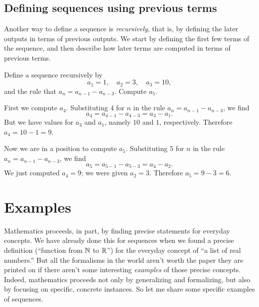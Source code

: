 \subsection{Defining sequences using previous terms}


Another way to define a sequence is \textit{recursively}, that is, by
defining the later outputs in terms of previous outputs.  We start by
defining the first few terms of the sequence, and then describe how
later terms are computed in terms of previous terms.

\begin{example}
Define a sequence recursively by
$$
a_1 = 1, \quad a_2 = 3, \quad a_3 = 10,
$$
and the rule that $a_n = a_{n-1} - a_{n-3}$.  Compute $a_5$.
\end{example}

\begin{solution}
  First we compute $a_4$.  Substituting $4$ for $n$ in the rule $a_n = a_{n-1} - a_{n-3}$, we find
$$
a_4 = a_{4-1} - a_{4-3} = a_3 - a_1.
$$
But we have values for $a_3$ and $a_1$, namely $10$ and $1$, respectively.  Therefore $a_4 = 10 - 1 = 9$.

Now we are in a position to compute $a_5$.  Substituting $5$ for $n$ in the rule $a_n = a_{n-1} - a_{n-3}$, we find
$$
a_5 = a_{5-1} - a_{5-3} = a_4 - a_2.
$$
We just computed $a_4 = 9$; we were given $a_2 = 3$.  Therefore $a_5 = 9 - 3 = 6$.
\end{solution}



\section{Examples}


Mathematics proceeds, in part, by finding precise statements for
everyday concepts.  We have already done this for sequences when we
found a precise definition (``function from $\mathbb{N}$ to $\mathbb{R}$'') for the
everyday concept of ``a list of real numbers.''  But all the
formalisms in the world aren't worth the paper they are printed on if
there aren't some interesting \textit{examples} of those precise
concepts.  Indeed, mathematics proceeds not only by generalizing and
formalizing, but also by focusing on specific, concrete instances.
So let me share some specific examples of sequences.


